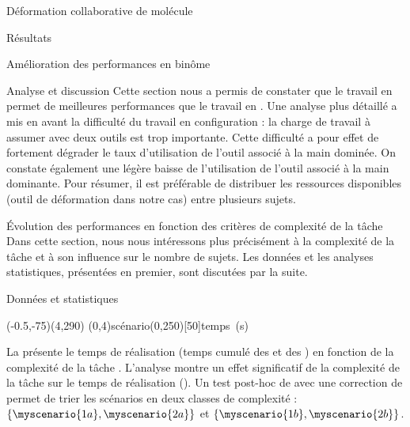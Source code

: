 \documentclass[myfrancais,ngerman,english,french]{mythesis}
\begin{document}
\begin{mychapter}{Déformation collaborative de molécule}
\begin{mysection}{Résultats}
\begin{mysubsection}{Amélioration des performances en binôme}
\begin{mysubsubsection}{Analyse et discussion}
					Cette section nous a permis de constater que le travail en  permet de meilleures performances que le travail en .
					Une analyse plus détaillé a mis en avant la difficulté du travail en configuration  : la charge de travail à assumer avec deux outils est trop importante.
					Cette difficulté a pour effet de fortement dégrader le taux d'utilisation de l'outil associé à la main dominée.
					On constate également une légère baisse de l'utilisation de l'outil associé à la main dominante.
					Pour résumer, il est préférable de distribuer les ressources disponibles (outil de déformation dans notre cas) entre plusieurs sujets.
				\end{mysubsubsection}
			\end{mysubsection}
			\begin{mysubsection}{Évolution des performances en fonction des critères de complexité de la tâche}
				Dans cette section, nous nous intéressons plus précisément à la complexité de la tâche et à son influence sur le nombre de sujets.
				Les données et les analyses statistiques, présentées en premier, sont discutées par la suite.
				\begin{mysubsubsection}{Données et statistiques}
					\begin{myfigure}
						\begin{myps}(-0.5,-75)(4,290)
							\myaxes(0,4){scénario}(0,250)[50]{temps~(s)}
						\end{myps}
					\end{myfigure}

					La  présente le temps de réalisation  (temps cumulé des  et des ) en fonction de la complexité de la tâche .
					L'analyse montre un effet significatif de la complexité de la tâche  sur le temps de réalisation  ().
					Un test post-hoc de  avec une correction de  permet de trier les scénarios en deux classes de complexité : $\left\{\myscenario{1a}, \myscenario{2a}\right\}$ et $\left\{\myscenario{1b}, \myscenario{2b}\right\}$.


\end{mysubsubsection}
\end{mysubsection}
\end{mysection}
\end{mychapter}
\end{document}
